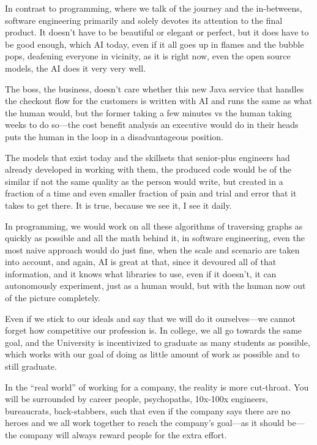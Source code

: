 \documentclass[12pt]{article}
\begin{document}
In contrast to programming, where we talk of the journey and the in-betweens,
software engineering primarily and solely devotes its attention to the final
product. It doesn't have to be beautiful or elegant or perfect, but it does have
to be good enough, which AI today, even if it all goes up in flames and the
bubble pops, deafening everyone in vicinity, as it is right now, even the open
source models, the AI does it very very well.

The boss, the business, doesn't care whether this new Java service that handles
the checkout flow for the customers is written with AI and runs the same as what
the human would, but the former taking a few minutes vs the human taking weeks
to do so---the cost benefit analysis an executive would do in their heads puts the
human in the loop in a disadvantageous position.

The models that exist today and the skillsets that senior-plus engineers had
already developed in working with them, the produced code would be of the
similar if not the same quality as the person would write, but created in a
fraction of a time and even smaller fraction of pain and trial and error that it
takes to get there. It is true, because we see it, I see it daily.

In programming, we would work on all these algorithms of traversing graphs as
quickly as possible and all the math behind it, in software engineering, even
the most naive approach would do just fine, when the scale and scenario are
taken into account, and again, AI is great at that, since it devoured all of
that information, and it knows what libraries to use, even if it doesn't, it can
autonomously experiment, just as a human would, but with the human now out of
the picture completely.

Even if we stick to our ideals and say that we will do it ourselves---we cannot
forget how competitive our profession is. In college, we all go towards the same
goal, and the University is incentivized to graduate as many students as
possible, which works with our goal of doing as little amount of work as
possible and to still graduate.

In the ``real world'' of working for a company, the reality is more
cut-throat. You will be surrounded by career people, psychopaths, 10x-100x
engineers, bureaucrats, back-stabbers, such that even if the company says there
are no heroes and we all work together to reach the company's goal---as it should
be---the company will always reward people for the extra effort.
\end{document}
